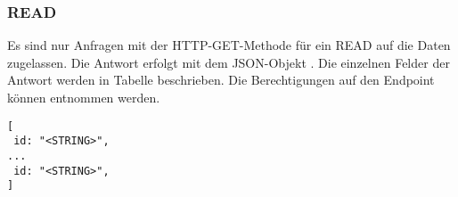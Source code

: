 \subsubsection{READ}
\label{sec:rest:api:user:guardians:read}
Es sind nur Anfragen mit der HTTP-GET-Methode für ein READ auf die Daten zugelassen.
Die Antwort erfolgt mit dem JSON-Objekt . Die einzelnen Felder der Antwort werden in Tabelle  beschrieben.
Die Berechtigungen auf den Endpoint können  entnommen werden.

\begin{lstlisting}[caption={JSON-Antwort für einen GET-Aufruf der Route /api/user/guardians},label={lst:code:rest:api:user:guardians:read:ret},frame=tlrb]
[
 id: "<STRING>",
...
 id: "<STRING>",
]
\end{lstlisting}
